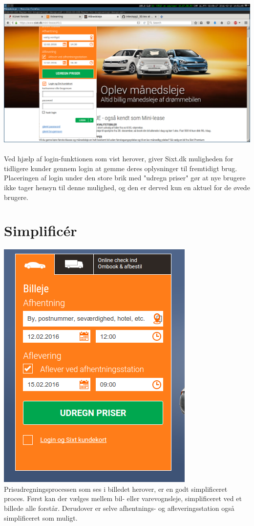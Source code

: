 \documentclass[12pt]{article}
\begin{document}
\includegraphics[scale=0.3]{img/PowerUser}
\\
\\
Ved hjælp af login-funktionen som vist herover, giver Sixt.dk muligheden for tidligere kunder gennem login at gemme deres oplysninger til fremtidigt brug. Placeringen af login under den store brik med "udregn priser" gør at nye brugere ikke tager hensyn til denne mulighed, og den er derved kun en aktuel for de øvede brugere. 

\section{Simplificér}

\includegraphics[scale=0.5]{img/simple}
\\
Prisudregningsprocessen som ses i billedet herover, er en godt simplificeret proces. Først kan der vælges mellem bil- eller varevognsleje, simplificeret ved et billede alle forstår. Derudover er selve afhentnings- og afleveringsstation også simplificeret som muligt.
\end{document}
